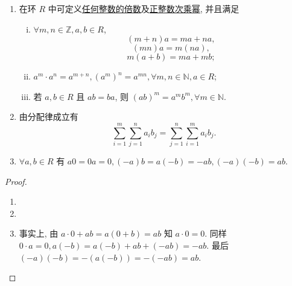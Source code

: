 \documentclass[../../main.tex]{subfiles}%
\begin{document}
\begin{theorem}[环的基本性质]\label{theorem:环的基本性质}
\begin{enumerate}[(1)]
\item 在环 \( R \) 中可定义\hyperref[definition:倍数的定义]{任何整数的倍数}及\hyperref[definition:n次乘幂]{正整数次乘幂}, 并且满足
\begin{enumerate}[(i)]
\item \( \forall m,n \in \mathbb{Z}, a,b \in R \),
\[
(m + n)a = ma + na,
\]
\[
(mn)a = m(na),
\]
\[
m(a + b) = ma + mb;
\]
\item \( a^m \cdot a^n = a^{m+n}, (a^m)^n = a^{mn}, \forall m,n \in \mathbb{N}, a \in R \);
\item 若 \( a,b \in R \) 且 \( ab = ba \), 则 \( (ab)^m = a^m b^m, \forall m \in \mathbb{N} \).
\end{enumerate}

\item 由分配律成立有
\[
\sum_{i=1}^m \sum_{j=1}^n a_i b_j = \sum_{j=1}^n \sum_{i=1}^m a_i b_j.
\]

\item \( \forall a,b \in R \) 有 \( a0 = 0a = 0, (-a)b = a(-b) = -ab, (-a)(-b) = ab \).
\end{enumerate}
\end{theorem}
\begin{proof}
\begin{enumerate}[(1)]
\item 

\item 

\item 事实上, 由 \( a \cdot 0 + ab = a(0 + b) = ab \) 知 \( a \cdot 0 = 0 \). 同样 \( 0 \cdot a = 0, a(-b) = a(-b) + ab + (-ab) = -ab \). 最后 \( (-a)(-b) = -(a(-b)) = -(-ab) = ab \).
\end{enumerate}
\end{proof}
\end{document}
